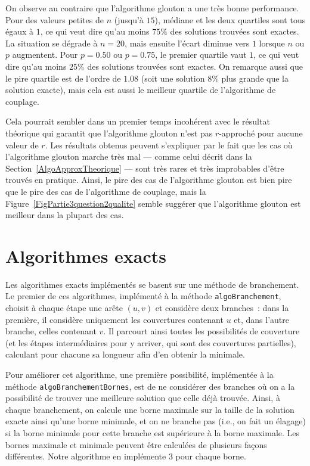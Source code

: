 \documentclass[a4paper,11pt]{amsart}
\theoremstyle{plain}
\begin{document}
On observe au contraire que l'algorithme glouton a une très bonne performance. Pour des valeurs petites de $n$ (jusqu'à $15$), médiane et les deux quartiles sont tous égaux à $1$, ce qui veut dire qu'au moins $75\%$ des solutions trouvées sont exactes. La situation se dégrade à $n = 20$, mais ensuite l'écart diminue vers $1$ lorsque $n$ ou $p$ augmentent. Pour $p = 0.50$ ou $p = 0.75$, le premier quartile vaut $1$, ce qui veut dire qu'au moins $25\%$ des solutions trouvées sont exactes. On remarque aussi que le pire quartile est de l'ordre de $1.08$ (soit une solution $8\%$ plus grande que la solution exacte), mais cela est aussi le meilleur quartile de l'algorithme de couplage.

Cela pourrait sembler dans un premier temps incohérent avec le résultat théorique qui garantit que l'algorithme glouton n'est pas $r$-approché pour aucune valeur de $r$. Les résultats obtenus peuvent s'expliquer par le fait que les cas où l'algorithme glouton marche très mal --- comme celui décrit dans la Section~\ref{AlgoApproxTheorique} --- sont très rares et très improbables d'être trouvés en pratique. Ainsi, le pire des cas de l'algorithme glouton est bien pire que le pire des cas de l'algorithme de couplage, mais la Figure~\ref{FigPartie3question2qualite} semble suggérer que l'algorithme glouton est meilleur dans la plupart des cas.

\section{Algorithmes exacts}
\label{SecAlgoExact}

Les algorithmes exacts implémentés se basent sur une méthode de branchement. Le premier de ces algorithmes, implémenté à la méthode \texttt{algoBranchement}, choisit à chaque étape une arête $(u, v)$ et considère deux branches~: dans la première, il considère uniquement les couvertures contenant $u$ et, dans l'autre branche, celles contenant $v$. Il parcourt ainsi toutes les possibilités de couverture (et les étapes intermédiaires pour y arriver, qui sont des couvertures partielles), calculant pour chacune sa longueur afin d'en obtenir la minimale.

Pour améliorer cet algorithme, une première possibilité, implémentée à la méthode \texttt{algoBranchementBornes}, est de ne considérer des branches où on a la possibilité de trouver une meilleure solution que celle déjà trouvée. Ainsi, à chaque branchement, on calcule une borne maximale sur la taille de la solution exacte ainsi qu'une borne minimale, et on ne branche pas (i.e., on fait un élagage) si la borne minimale pour cette branche est supérieure à la borne maximale. Les bornes maximale et minimale peuvent être calculées de plusieurs façons différentes. Notre algorithme en implémente $3$ pour chaque borne.
\end{document}
